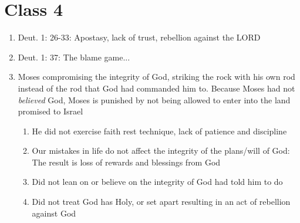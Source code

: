 \documentclass[11pt]{article}
\begin{document}
\section{Class 4}
\begin{enumerate}
	\item Deut. 1: 26-33: Apostasy, lack of trust, rebellion against the LORD
	\item Deut. 1: 37: The blame game...
	\item Moses compromising the integrity of God, striking the rock with his own rod instead of the rod that God had commanded him to. Because Moses had not \emph{believed} God, Moses is punished by not being allowed to enter into the land promised to Israel
	\begin{enumerate}
		\item He did not exercise faith rest technique, lack of patience and discipline
		\item Our mistakes in life do not affect the integrity of the plans/will of God: The result is loss of rewards and blessings from God
		\item Did not lean on or believe on the integrity of God had told him to do
		\item Did not treat God has Holy, or set apart resulting in an act of rebellion against God
	\end{enumerate}
\end{enumerate}
\end{document}
